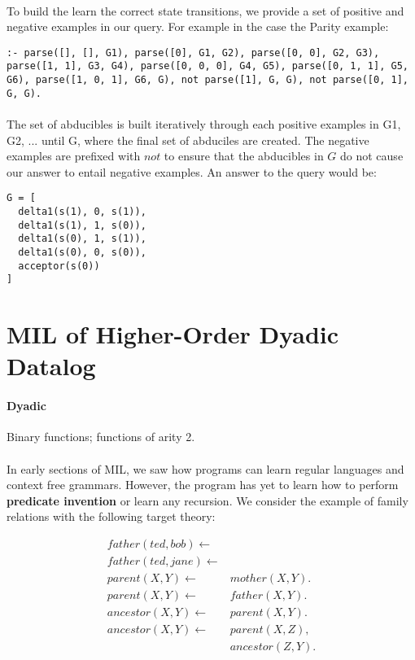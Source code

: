 \documentclass{article}
\theoremstyle{plain}
\theoremstyle{definition}
\begin{document}
\begin{multicols}{2}
\paragraph{} To build the learn the correct state transitions, we provide a set of positive and negative examples in our query. For example in the case the Parity example:

\begin{lstlisting}
:- parse([], [], G1), parse([0], G1, G2), parse([0, 0], G2, G3), parse([1, 1], G3, G4), parse([0, 0, 0], G4, G5), parse([0, 1, 1], G5, G6), parse([1, 0, 1], G6, G), not parse([1], G, G), not parse([0, 1], G, G).
\end{lstlisting}

\paragraph{} The set of abducibles is built iteratively through each positive examples in G1, G2, ... until G, where the final set of abduciles are created. The negative examples are prefixed with $not$ to ensure that the abducibles in $G$ do not cause our answer to entail negative examples. An answer to the query would be:

\begin{lstlisting}
G = [
  delta1(s(1), 0, s(1)),
  delta1(s(1), 1, s(0)),
  delta1(s(0), 1, s(1)),
  delta1(s(0), 0, s(0)),
  acceptor(s(0))
]
\end{lstlisting}

\section{MIL of Higher-Order Dyadic Datalog}

\paragraph{Dyadic} Binary functions; functions of arity 2.

\paragraph{} In early sections of MIL, we saw how programs can learn regular languages and context free grammars. However, the program has yet to learn how to perform \textbf{predicate invention} or learn any recursion. We consider the example of family relations with the following target theory:

\begin{align*}
father(ted, bob) \leftarrow&\\
father(ted, jane) \leftarrow&\\
parent(X, Y) \leftarrow\ &mother(X, Y).\\
parent(X, Y) \leftarrow\ &father(X, Y).\\
ancestor(X, Y) \leftarrow\ &parent(X, Y).\\
ancestor(X, Y) \leftarrow\ &parent(X, Z),\\ &ancestor(Z, Y).\\
\end{align*}


\end{multicols}
\end{document}
